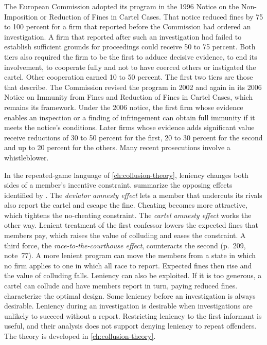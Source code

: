 The European Commission adopted its program in the 1996 Notice on the Non-Imposition or Reduction of Fines in
Cartel Cases. That notice reduced fines by 75 to 100 percent for a firm that reported before the Commission had
ordered an investigation. A firm that reported after such an investigation had failed to establish sufficient
grounds for proceedings could receive 50 to 75 percent. Both tiers also required the firm to be the first to adduce
decisive evidence, to end its involvement, to cooperate fully and not to have coerced others or instigated the
cartel. Other cooperation earned 10 to 50 percent. The first two
tiers are those that \citet[footnote~6]{ChenRey2013} describe. The Commission revised the program in 2002
\citep[footnote~1]{ChenRey2013} and again in its 2006 Notice on Immunity from Fines and Reduction of Fines in Cartel
Cases, which remains its framework. Under the 2006 notice, the first firm whose evidence enables an inspection or
a finding of infringement can obtain full immunity if it meets the notice's conditions. Later firms whose evidence
adds significant value receive reductions of 30 to 50 percent for the first, 20 to 30 percent for the second and up
to 20 percent for the others. Many recent prosecutions involve a whistleblower.

In the repeated-game language of \cref{ch:collusion-theory}, leniency changes both sides of a member's incentive
constraint. \citet[pp.~209--210]{AskerNocke2021} summarize the opposing effects identified by \citet{Harrington2008}.
The \emph{deviator amnesty effect} lets a member that undercuts its rivals also report the cartel and escape the
fine. Cheating becomes more attractive, which tightens the no-cheating constraint. The \emph{cartel amnesty effect}
works the other way. Lenient treatment of the first confessor lowers the expected fines that members pay, which
raises the value of colluding and eases the constraint. A third force, the \emph{race-to-the-courthouse effect},
counteracts the second (p.~209, note~77). A more lenient program can move the members from a state in which no
firm applies to one in which all race to report. Expected fines then rise and the value of colluding falls.
Leniency can also be exploited. If it is too generous, a cartel can collude and have members report in turn,
paying reduced fines. \citet{ChenRey2013} characterize the
optimal design. Some leniency before an investigation is always desirable. Leniency during an investigation is
desirable when investigations are unlikely to succeed without a report. Restricting leniency to the first informant
is useful, and their analysis does not support denying leniency to repeat offenders. The theory is developed in
\cref{ch:collusion-theory}.

